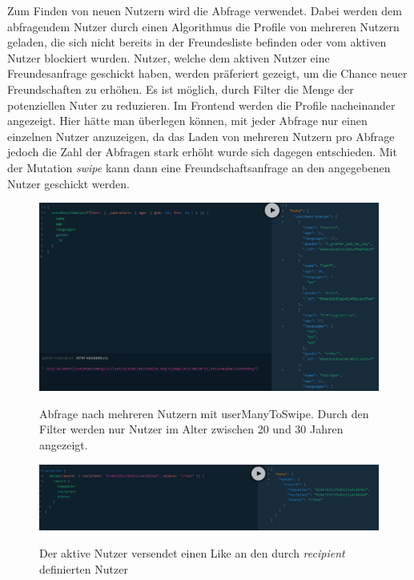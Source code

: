 Zum Finden von neuen Nutzern wird die Abfrage  verwendet. Dabei werden dem abfragendem Nutzer durch einen Algorithmus die Profile von mehreren Nutzern geladen, die sich nicht bereits in der Freundesliste befinden oder vom aktiven Nutzer blockiert wurden. Nutzer, welche dem aktiven Nutzer eine Freundesanfrage geschickt haben, werden präferiert gezeigt, um die Chance neuer Freundschaften zu erhöhen. Es ist möglich, durch Filter die Menge der potenziellen Nuter zu reduzieren. Im Frontend werden die Profile nacheinander angezeigt. Hier hätte man überlegen können, mit jeder Abfrage nur einen einzelnen Nutzer anzuzeigen, da das Laden von mehreren Nutzern pro Abfrage jedoch die Zahl der Abfragen stark erhöht wurde sich dagegen entschieden.
Mit der Mutation \textit{swipe} kann dann eine Freundschaftsanfrage an den angegebenen Nutzer geschickt werden.

\begin{figure}
	\centering
    \includegraphics[width=\textwidth]{sources/graphiql_userManyToSwipe.png}\cite{}
	\caption{Abfrage nach mehreren Nutzern mit userManyToSwipe. Durch den Filter werden nur Nutzer im Alter zwischen 20 und 30 Jahren angezeigt.}
	\label{fig5}
\end{figure}

\begin{figure}
	\centering
    \includegraphics[width=\textwidth]{sources/graphiql_swipe.png}\cite{}
	\caption{Der aktive Nutzer versendet einen Like an den durch \textit{recipient} definierten Nutzer}
	\label{fig6}
\end{figure}

